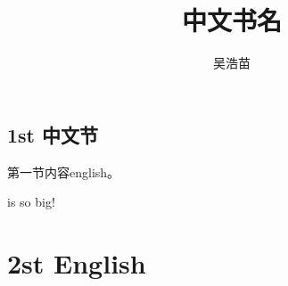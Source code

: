 \documentclass[UTF8]{article} %
\author{吴浩苗}
\title{中文书名}
\begin{document}
    \begin{CJK}{UTF8}{gkai}
    \maketitle
		\section{1st 中文节}
	\end{CJK}
	\begin{CJK}{UTF8}{gbsn}	
		第一节内容english。
	\end{CJK}
	is so big!
	\section{2st English}


	
\end{document}

